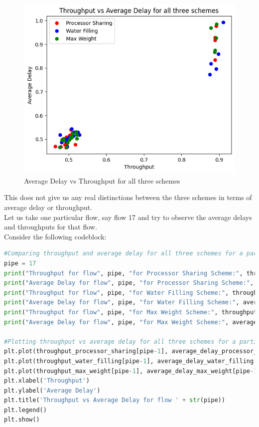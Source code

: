 \documentclass[11pt, a4paper]{article}
\begin{document}
\begin{figure}[H]
     \centering
     \includegraphics[scale=0.5]{fig_7.png}
     \caption{Average Delay vs Throughput for all three schemes}
\end{figure}

This does not give us any real distinctions between the three schemes in terms of average delay or throughput. \\
Let us take one particular flow, say flow 17 and try to observe the average delays and throughputs for that flow.\\
Consider the following codeblock:

\begin{lstlisting}[language=Python]
#Comparing throughput and average delay for all three schemes for a particular flow
pipe = 17
print("Throughput for flow", pipe, "for Processor Sharing Scheme:", throughput_processor_sharing[pipe-1])
print("Average Delay for flow", pipe, "for Processor Sharing Scheme:", average_delay_processor_sharing[pipe-1])
print("Throughput for flow", pipe, "for Water Filling Scheme:", throughput_water_filling[pipe-1])
print("Average Delay for flow", pipe, "for Water Filling Scheme:", average_delay_water_filling[pipe-1])
print("Throughput for flow", pipe, "for Max Weight Scheme:", throughput_max_weight[pipe-1])
print("Average Delay for flow", pipe, "for Max Weight Scheme:", average_delay_max_weight[pipe-1])

#Plotting throughput vs average delay for all three schemes for a particular flow
plt.plot(throughput_processor_sharing[pipe-1], average_delay_processor_sharing[pipe-1], 'ro', label = 'Processor Sharing')
plt.plot(throughput_water_filling[pipe-1], average_delay_water_filling[pipe-1], 'bo', label = 'Water Filling')
plt.plot(throughput_max_weight[pipe-1], average_delay_max_weight[pipe-1], 'go', label = 'Max Weight')
plt.xlabel('Throughput')
plt.ylabel('Average Delay')
plt.title('Throughput vs Average Delay for flow ' + str(pipe))
plt.legend()
plt.show()

\end{lstlisting}
\end{document}
